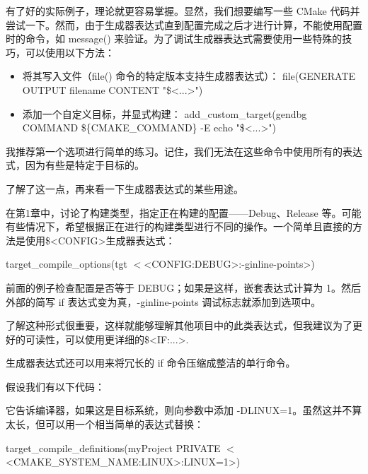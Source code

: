 
有了好的实际例子，理论就更容易掌握。显然，我们想要编写一些 CMake 代码并尝试一下。然而，由于生成器表达式直到配置完成之后才进行计算，不能使用配置时的命令，如 message() 来验证。为了调试生成器表达式需要使用一些特殊的技巧，可以使用以下方法：

\begin{itemize}
\item
将其写入文件（file() 命令的特定版本支持生成器表达式）： file(GENERATE OUTPUT filename CONTENT "\$<...>")

\item
添加一个自定义目标，并显式构建： add\_custom\_target(gendbg COMMAND \$\{CMAKE\_COMMAND\} -E echo "\$<...>")
\end{itemize}

我推荐第一个选项进行简单的练习。记住，我们无法在这些命令中使用所有的表达式，因为有些是特定于目标的。

了解了这一点，再来看一下生成器表达式的某些用途。


在第1章中，讨论了构建类型，指定正在构建的配置——Debug、Release 等。可能有些情况下，希望根据正在进行的构建类型进行不同的操作。一个简单且直接的方法是使用\$<CONFIG>生成器表达式：

\begin{shell}
target_compile_options(tgt $<$<CONFIG:DEBUG>:-ginline-points>)
\end{shell}

前面的例子检查配置是否等于 DEBUG；如果是这样，嵌套表达式计算为 1。然后外部的简写 if 表达式变为真，-ginline-points 调试标志就添加到选项中。

了解这种形式很重要，这样就能够理解其他项目中的此类表达式，但我建议为了更好的可读性，可以使用更详细的\$<IF:...>.


生成器表达式还可以用来将冗长的 if 命令压缩成整洁的单行命令。

假设我们有以下代码：


它告诉编译器，如果这是目标系统，则向参数中添加 -DLINUX=1。虽然这并不算太长，但可以用一个相当简单的表达式替换：

\begin{cmake}
target_compile_definitions(myProject PRIVATE
                           $<$<CMAKE_SYSTEM_NAME:LINUX>:LINUX=1>)
\end{cmake}

